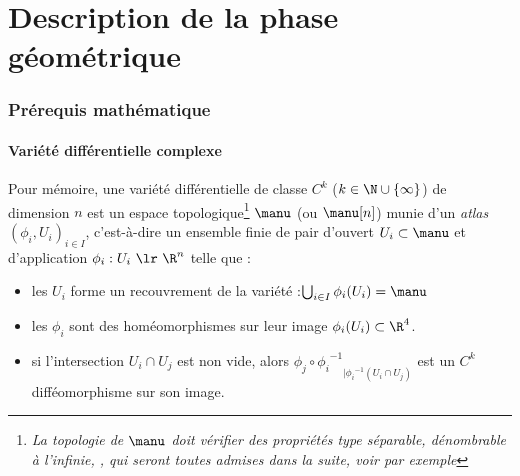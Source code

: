 
%




\part{Description de la phase géométrique}\label{part:phase_geo?}
	
\section{Prérequis mathématique}

\subsection{Variété différentielle complexe}



Pour mémoire, une variété différentielle de classe $C^k$ ($k\in\N\cup\{\infty\}$) de dimension $n$ est un espace topologique\footnote{\itshape
	La topologie de $\manu$ doit vérifier des propriétés type séparable, dénombrable à l'infinie, \etc, qui seront toutes admises dans la suite, voir par exemple }
 $\manu$ (ou $\manu[n]$) munie d'un \emph{atlas} $(\phi_i, U_i)_{i\in I}$, c'est-à-dire un ensemble finie de pair d'ouvert $U_i\subset \manu$ et d'application $\phi_i :U_i\ \lr\ \R^n$ telle que :
\begin{itemize}
	
	\item les $U_i$ forme un recouvrement de la variété :\qquad $\bigcup_{i\in I} \phi_i(U_i) = \manu$
	
	\item les $\phi_i$ sont des homéomorphismes sur leur image $\phi_i(U_i)\subset\R^4$.
	
	\item si l'intersection $U_i \cap U_j$ est non vide, alors ${\phi_j \circ {\phi_i}^{-1}}_{| {\phi_i}^{-1}(U_i\cap U_j)}$ est un $C^k$ difféomorphisme sur son image.
\end{itemize}

